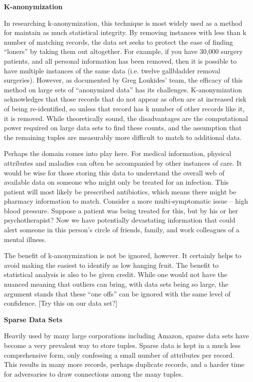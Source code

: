 \documentclass[10pt,journal,compsoc]{IEEEtran}
\begin{document}
\noindent \textbf{K-anonymization}

	In researching k-anonymization, this technique is most widely used as a method for maintain as much statistical integrity.  By removing instances with less than k number of matching records, the data set seeks to protect the ease of finding “loners” by taking them out altogether.  For example, if you have 30,000 surgery patients, and all personal information has been removed, then it is possible to have multiple instances of the same data (i.e. twelve gallbladder removal surgeries).  However, as documented by Greg Loukides’ team,  the efficacy of this method on large sets of “anonymized data”  has its challenges\cite{loukides}.  K-anonymization acknowledges that those records that do not appear as often are at increased risk of being re-identified, so unless that record has k number of other records like it, it is removed.  While theoretically sound, the disadvantages are the computational power required on large data sets to find these counts, and the assumption that the remaining tuples are measurably more difficult to match to additional data.  
	
	Perhaps the domain comes into play here.  For medical information, physical attributes and maladies can often be accompanied by other instances of care.  It would be wise for those storing this data to understand the overall web of available data on someone who might only be treated for an infection.  This patient will most likely be prescribed antibiotics, which means there might be pharmacy information to match.   Consider a more multi-symptomatic  issue – high blood pressure.  Suppose a patient was being treated for this, but by his or her psychotherapist?  Now we have potentially devastating information that could alert someone in this person’s circle of friends, family, and work colleagues of a mental illness.
	
	The benefit of k-anonymization is not be ignored, however.  It certainly helps to avoid making the easiest to identify as low hanging fruit.  The benefit to statistical analysis is also to be given credit.  While one would not have the nuanced meaning that outliers can bring, with data sets being so large, the argument stands that these “one offs” can be ignored with the same level of confidence.
[Try this on our data set?]

\noindent \textbf{Sparse Data Sets}

	Heavily used by many large corporations including Amazon, sparse data sets have become a very prevalent way to store tuples\cite{narayanan,gentry,rimes}.  Sparse data is kept in a much less comprehensive form, only confessing a small number of attributes per record.  This results in many more records, perhaps duplicate records, and a harder time for adversaries to draw connections among the many tuples.
	
\end{document}
